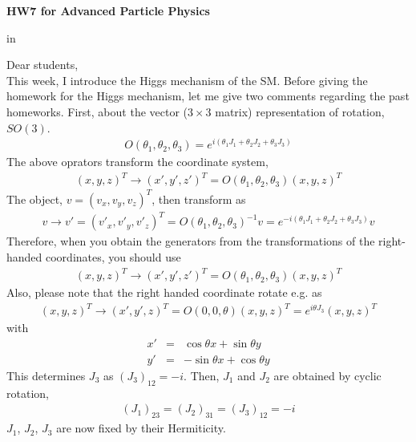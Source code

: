 \documentclass[12pt]{article}
\begin{document}
\begin{center}
{\large\bf HW7 for Advanced Particle Physics} \\

\end{center}

 in

Dear students,\\

  This week, I introduce the Higgs mechanism of the SM.
  Before giving the homework for the Higgs mechanism, let
  me give two comments regarding the past homeworks.
  First, about the vector ($3 \times 3$ matrix) representation
  of rotation, $SO(3)$.
 \begin{eqnarray}
  O(\theta_1,\theta_2,\theta_3) = e^{ i (\theta_1 J_1 + \theta_2 J_2 + \theta_3 J_3) }
 \end{eqnarray}
   The above oprators transform the coordinate system,
\begin{eqnarray}
  (x,y,z)^T \to (x',y',z')^T = O(\theta_1,\theta_2,\theta_3) (x,y,z)^T
\end{eqnarray}
  The object, $v = (v_x,v_y,v_z)^T$, then transform as
\begin{eqnarray}
  v \to v' = (v'_x,v'_y,v'_z)^T
  = O(\theta_1,\theta_2,\theta_3)^{-1} v
  = e^{ -i (\theta_1 J_1 + \theta_2 J_2 + \theta_3 J_3) } v
\end{eqnarray}
   Therefore, when you obtain the generators from the
  transformations of the right-handed coordinates,
  you should use
\begin{eqnarray}
  (x,y,z)^T \to (x',y',z')^T = O(\theta_1,\theta_2,\theta_3) (x,y,z)^T
\end{eqnarray}
   Also, please note that the right handed coordinate
  rotate e.g. as
\begin{eqnarray}
  (x,y,z)^T \to (x',y',z)^T = O(0,0,\theta) (x,y,z)^T
                          = e^{ i \theta J_3 } (x,y,z)^T
\end{eqnarray}
 with
 \begin{eqnarray}
   x' &=& \cos\theta x+ \sin \theta y \\
   y' &=& -\sin \theta x + \cos \theta y  
 \end{eqnarray}
This determines $J_3$ as $(J_3)_{12} = -i$.
Then, $J_1$ and $J_2$ are obtained by cyclic rotation,
\begin{eqnarray}
  (J_1)_{23} = (J_2)_{31} = (J_3)_{12} = -i
\end{eqnarray}
   $J_1$, $J_2$, $J_3$ are now fixed by their Hermiticity.
\end{document}

